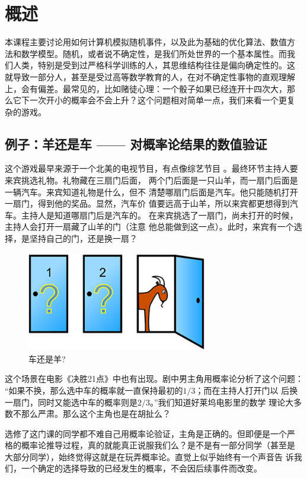 \chapter{概述}

本课程主要讨论用如何计算机模拟随机事件，以及此为基础的优化算法、数值方
法和数学模型。随机，或者说不确定性，是我们所处世界的一个基本属性。而我
们人类，特别是受到过严格科学训练的人，其思维结构往往是偏向确定性的。这
就导致一部分人，甚至是受过高等数学教育的人，在对不确定性事物的直观理解
上，会有偏差。最常见的，比如赌徒心理：一个骰子如果已经连开十四次大，那
么它下一次开小的概率会不会上升？这个问题相对简单一点，我们来看一个更复
杂的游戏。

\section{例子：羊还是车 —— 对概率论结果的数值验证}
这个游戏最早来源于一个北美的电视节目，有点像综艺节目
\cite{Blues2016Edos}。最终环节主持人要来宾挑选礼物。礼物藏在三扇门后面，
两个门后面是一只山羊，而一扇门后面是一辆汽车。来宾知道礼物是什么，但不
清楚哪扇门后面是汽车。他只能随机打开一扇门，得到他的奖品。显然，汽车价
值要远高于山羊，所以来宾都更想得到汽车。主持人是知道哪扇门后是汽车的。
在来宾挑选了一扇门，尚未打开的时候，主持人会打开一扇藏了山羊的门（注意
  他总能做到这一点）。此时，来宾有一个选择，是坚持自己的门，还是换一扇？

\begin{figure}[!ht]
\centering
\includegraphics[width=0.7\textwidth]{images/game.jpg}
\caption{车还是羊?}
\label{fig::game}
\end{figure}

这个场景在电影《决胜21点》中也有出现。剧中男主角用概率论分析了这个问题：
``如果不换，那么选中车的概率就一直保持最初的$1/3$；而在主持人打开门以
后换一扇门，同时又能选中车的概率则是$2/3$。''我们知道好莱坞电影里的数学
理论大多数不那么严肃。那么这个主角也是在胡扯么？

选修了这门课的同学都不难自己用概率论验证，主角是正确的。但即便是一个严
格的概率论推导过程，真的就能真正说服我们么？是不是有一部分同学（甚至是
  大部分同学），始终觉得这就是在玩弄概率论。直觉上似乎始终有一个声音告
诉我们，一个确定的选择导致的已经发生的概率，不会因后续事件而改变。

